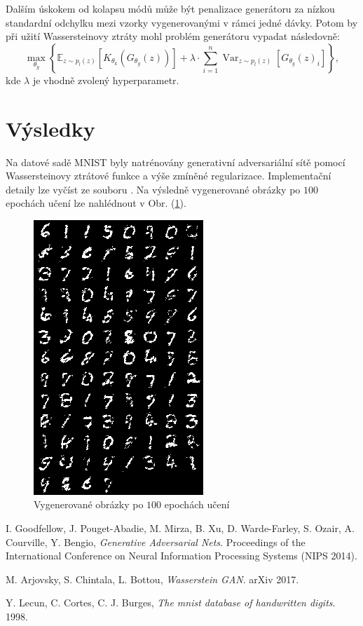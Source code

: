 \documentclass[czech]{article}
\begin{document}
Dalším úskokem od kolapsu módů může být penalizace generátoru za nízkou standardní odchylku mezi vzorky vygenerovanými v rámci jedné dávky.
Potom by při užití Wassersteinovy ztráty mohl problém generátoru vypadat následovně:
\begin{equation}
    \max_{\theta_g} \left\{ \mathbb{E}_{z \sim p_l(z)} \left[K_{\theta_k}\left(G_{\theta_g}(z)\right)\right]
     + \lambda \cdot \sum_{i = 1}^{n} \operatorname{Var}_{z \sim p_l(z)} \left[G_{\theta_g}(z)_i\right]\right\},
\end{equation}
kde $\lambda$ je vhodně zvolený hyperparametr.

\section{Výsledky}

Na datové sadě MNIST \cite{MNIST} byly natrénovány generativní adversariální sítě pomocí Wassersteinovy ztrátové funkce
a výše zmíněné regularizace.
Implementační detaily lze vyčíst ze souboru .
Na výsledně vygenerované obrázky po $100$ epochách učení lze nahlédnout v Obr. (\ref{obr}).

\begin{figure}
    \centering
    \includegraphics{graphics/samples_100.png}
    \caption{Vygenerované obrázky po $100$ epochách učení}
    \label{obr}
\end{figure}

\newpage{}

\begin{thebibliography}{1}

 I. Goodfellow, J. Pouget-Abadie, M. Mirza, B. Xu, D. Warde-Farley, S. Ozair, A. Courville, Y. Bengio,
\emph{Generative Adversarial Nets}.
Proceedings of the International Conference on Neural Information Processing Systems (NIPS 2014).

 M. Arjovsky, S. Chintala, L. Bottou,
\emph{Wasserstein GAN}.
arXiv 2017.

 Y. Lecun, C. Cortes, C. J. Burges,
\emph{The mnist database of handwritten digits}. 1998.

\end{thebibliography}
\end{document}

